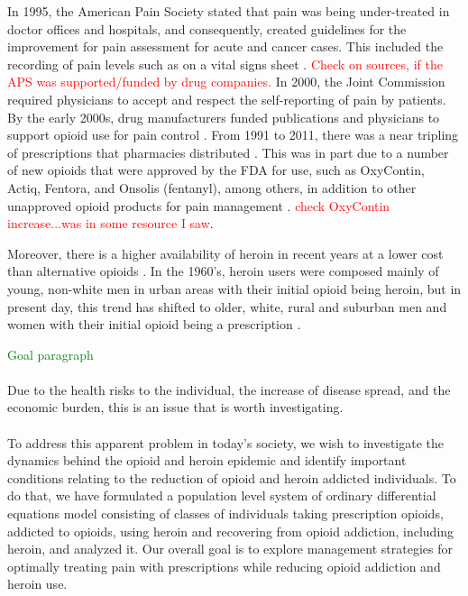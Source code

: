 \documentclass[12pt]{article}
\begin{document}
In 1995, the American Pain Society stated that pain was being under-treated in doctor offices and hospitals, and consequently, created guidelines for the improvement for pain assessment for acute and cancer cases. This included the recording of pain levels such as on a vital signs sheet \cite{Mandell} \cite{APSQCC}. \textcolor{red}{Check on sources, if the APS was supported/funded by drug companies.} In 2000, the Joint Commission required physicians to accept and respect the self-reporting of pain by patients. By the early 2000s, drug manufacturers funded publications and physicians to support opioid use for pain control \cite{Mandell}. From 1991 to 2011, there was a near tripling of prescriptions that pharmacies distributed \cite{NIDA1}. This was in part due to a number of new opioids that were approved by the FDA for use, such as OxyContin, Actiq, Fentora, and Onsolis (fentanyl), among others, in addition to other unapproved opioid products for pain management \cite{FDA1}. \textcolor{red}{check OxyContin increase...was in some resource I saw}. 

Moreover, there is a higher availability of heroin in recent years at a lower cost than alternative opioids \cite{NIDA1}. In the 1960's, heroin users were composed mainly of young, non-white men in urban areas with their initial opioid being heroin, but in present day, this trend has shifted to older, white, rural and suburban men and women with their initial opioid being a prescription \cite{NIDA1}. 

\textcolor{green}{Goal paragraph} \\ \\

Due to the health risks to the individual, the increase of disease spread, and the economic burden, this is an issue that is worth investigating. \\ \\

To address this apparent problem in today's society, we wish to investigate the dynamics behind the opioid and heroin epidemic and identify important conditions relating to the reduction of opioid and heroin addicted individuals. To do that, we have formulated a population level system of ordinary differential equations model consisting of classes of individuals taking prescription opioids, addicted to opioids, using heroin and recovering from opioid addiction, including heroin, and analyzed it. Our overall goal is to explore management strategies for optimally treating pain with prescriptions while reducing opioid addiction and heroin use. 
\end{document}
